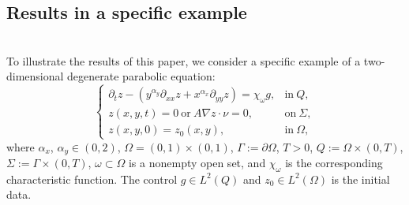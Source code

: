 \documentclass[9pt,reqno]{amsart}
\theoremstyle{plain}
\numberwithin{equation}{section}
\numberwithin{theorem}{section}
\begin{document}
	\subsection{Results in a specific example}
	
	\hspace*{\fill}\\
	
	To illustrate the results of this paper, we consider a specific example of a two-dimensional degenerate parabolic equation:
	\begin{equation}\label{4.1}
		\begin{cases}
			\partial_{t}z - (y^{\alpha_y}\partial_{xx}z +x^{\alpha_x}\partial_{yy}z )=\chi_{\omega}g, & \mbox{in} \ Q,  \\
			z(x,y,t)=0 \ \mbox{or} \ A\nabla z \cdot \nu =0, & \mbox{on} \ \Sigma,  \\
			z(x,  y,  0)= z_{0}(x,  y),  & \mbox{in} \ \Omega,  
		\end{cases}
	\end{equation}
	where $\alpha_x$, $\alpha_y \in (0,2)$, $\Omega=(0,1)\times(0,1)$, $\Gamma:= \partial\Omega$, $T>0$, $Q:=\Omega\times (0,T)$, $\Sigma:= \Gamma\times(0,T)$, $\omega \subset \Omega$ is a nonempty open set, and $\chi_{\omega}$ is the corresponding characteristic function. The control $g \in L^{2}(Q)$ and $z_0 \in L^{2}(\Omega)$ is the initial data.
	
\end{document}
